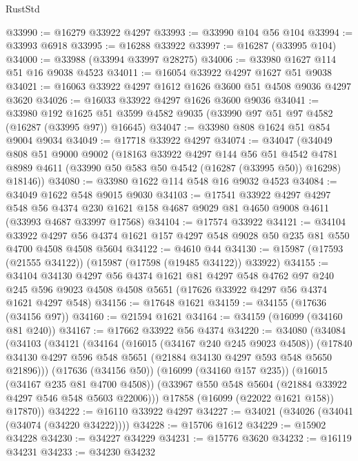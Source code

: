 \begin{lexlean}{RustStd}
\begin{coremodule}
@33990 := @16279 @33922 @4297
@33993 := @33990 @104 @56 @104
@33994 := @33993 @6918
@33995 := @16288 @33922
@33997 := @16287 (@33995 @104)
@34000 := @33988 (@33994 @33997 @28275)
@34006 := @33980 @1627 @114 @51 @16 @9038 @4523
@34011 := @16054 @33922 @4297 @1627 @51 @9038
@34021 := @16063 @33922 @4297 @1612 @1626 @3600 @51 @4508 @9036 @4297 @3620
@34026 := @16033 @33922 @4297 @1626 @3600 @9036
@34041 := @33980
    @192
    @1625
    @51
    @3599
    @4582
    @9035
    (@33990 @97 @51 @97 @4582 (@16287 (@33995 @97)) @16645)
@34047 := @33980 @808 @1624 @51 @854 @9004 @9034
@34049 := @17718 @33922 @4297
@34074 := @34047
    (@34049
      @808
      @51
      @9000
      @9002
      (@18163
        @33922
        @4297
        @144
        @56
        @51
        @4542
        @4781
        @8989
        @4611
        (@33990 @50 @583 @50 @4542 (@16287 (@33995 @50)) @16298)
        @18146))
@34080 := @33980 @1622 @114 @548 @16 @9032 @4523
@34084 := @34049 @1622 @548 @9015 @9030
@34103 := @17541
    @33922
    @4297
    @4297
    @548
    @56
    @4374
    @230
    @1621
    @158
    @4687
    @9029
    @81
    @4650
    @9008
    @4611
    (@33993 @4687 @33997 @17568)
@34104 := @17574 @33922
@34121 := @34104
    @33922
    @4297
    @56
    @4374
    @1621
    @157
    @4297
    @548
    @9028
    @50
    @235
    @81
    @550
    @4700
    @4508
    @4508
    @5604
@34122 := @4610 @44
@34130 := @15987 (@17593 (@21555 @34122)) (@15987 (@17598 (@19485 @34122)) @33922)
@34155 := @34104
    @34130
    @4297
    @56
    @4374
    @1621
    @81
    @4297
    @548
    @4762
    @97
    @240
    @245
    @596
    @9023
    @4508
    @4508
    @5651
    (@17626 @33922 @4297 @56 @4374 @1621 @4297 @548)
@34156 := @17648 @1621
@34159 := @34155 (@17636 (@34156 @97))
@34160 := @21594 @1621
@34164 := @34159 (@16099 (@34160 @81 @240))
@34167 := @17662 @33922 @56 @4374
@34220 := @34080
    (@34084
      (@34103
        (@34121
          (@34164
            (@16015 (@34167 @240 @245 @9023 @4508))
            (@17840 @34130 @4297 @596 @548 @5651 (@21884 @34130 @4297 @593 @548 @5650 @21896)))
          (@17636 (@34156 @50))
          (@16099 (@34160 @157 @235))
          (@16015 (@34167 @235 @81 @4700 @4508))
          (@33967 @550 @548 @5604 (@21884 @33922 @4297 @546 @548 @5603 @22006)))
        @17858
        (@16099 (@22022 @1621 @158))
        @17870))
@34222 := @16110 @33922 @4297
@34227 := @34021 (@34026 (@34041 (@34074 (@34220 @34222))))
@34228 := @15706 @1612
@34229 := @15902 @34228
@34230 := @34227 @34229
@34231 := @15776 @3620
@34232 := @16119 @34231
@34233 := @34230 @34232

\end{coremodule}
\end{lexlean}

